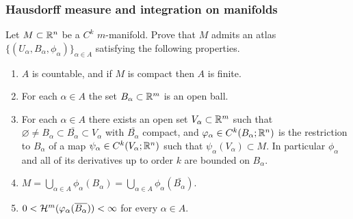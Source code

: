 \documentclass[a4paper]{article}
\begin{document}
\subsubsection{Hausdorff measure and integration on
  manifolds}

\begin{thm}
  Let $M \subset \mathbb{R}^n$ be a $C^k$ $m$-manifold. Prove that $M$ admits an
  atlas $\{(U_\alpha,B_\alpha, \phi_\alpha)\}_{\alpha \in A}$ satisfying
  the following properties.
  \begin{enumerate}
    \item $A$ is countable, and if $M$ is compact then $A$
          is finite.
    \item For each $\alpha \in A$ the set $B_\alpha \subset \mathbb{R}^m$ is an
          open ball.
    \item For each $\alpha \in A$ there exists an open set $V_\alpha
          \subset \mathbb{R}^m$ such that $\varnothing \neq B_\alpha \subset
          \bar{B_\alpha} \subset V_\alpha$ with $\bar{B_\alpha}$ compact,
          and $\varphi_\alpha \in C^k(B_\alpha;\mathbb{R}^n)$ is the restriction to
          $B_\alpha$ of a map $\psi_\alpha \in C^k(V_\alpha;\mathbb{R}^n)$ such
          that $\psi_\alpha(V_\alpha) \subset M$. In particular
          $\phi_\alpha$ and all of its derivatives up to order $k$ are
          bounded on $B_\alpha$.

    \item $M = \bigcup_{\alpha \in A} \phi_\alpha(B_\alpha)
            = \bigcup_{\alpha \in A} \phi_{\alpha}(\bar{B_\alpha})$.

    \item $0 < \mathcal{H}^m(\varphi_\alpha(\overline{B_\alpha})) < \infty$
          for every $\alpha \in A$.
  \end{enumerate}
\end{thm}
\end{document}
